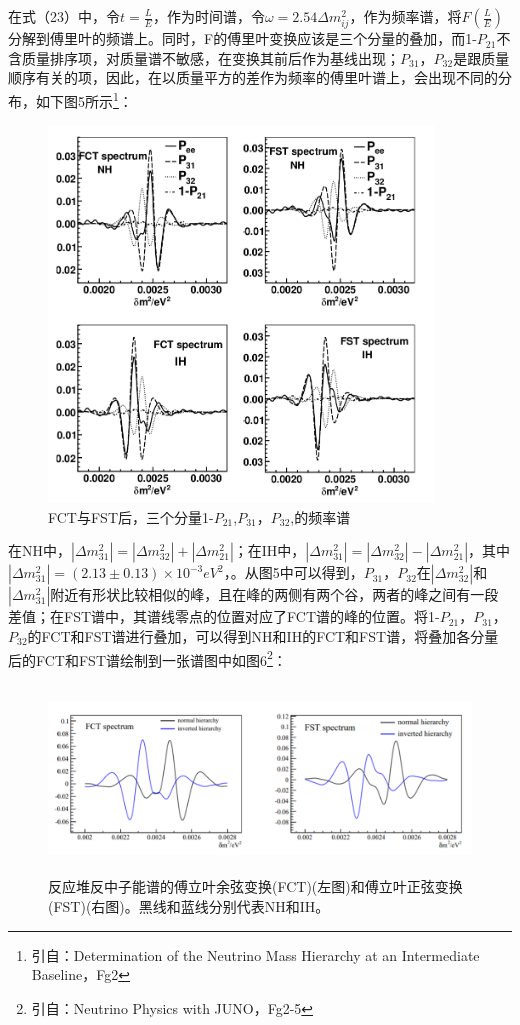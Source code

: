 \documentclass[10pt,a4paper]{article}
\begin{document}
在式（23）中，令$t=\frac{L}{E}$，作为时间谱，令$\omega=2.54\Delta m_{ij}^2$，作为频率谱，将$F(\frac{L}{E})$分解到傅里叶的频谱上。同时，F的傅里叶变换应该是三个分量的叠加，而1-$P_{21}$不含质量排序项，对质量谱不敏感，在变换其前后作为基线出现；$P_{31}$，$P_{32}$是跟质量顺序有关的项，因此，在以质量平方的差作为频率的傅里叶谱上，会出现不同的分布，如下图5所示\footnote{引自：Determination of the Neutrino Mass Hierarchy at an Intermediate Baseline，Fg2}：
\begin{figure}[ht]
 \centering
 \includegraphics[height=10cm]{images/diff-P31-P32.png}
 \caption{FCT与FST后，三个分量1-$P_{21}$,$P_{31}$，$P_{32}$,的频率谱}
 \label{fig:singleblock}
\end{figure}


在NH中，$|\Delta m_{31}^2|=|\Delta m_{32}^2|+|\Delta m_{21}^2|$；在IH中，$|\Delta m_{31}^2|=|\Delta m_{32}^2|-|\Delta m_{21}^2|$，其中$|\Delta m_{31}^2|=(2.13 \pm 0.13) \times 10^{-3}{eV}^2 $，。从图5中可以得到，$P_{31}$，$P_{32}$在$|\Delta m_{32}^2|$和$|\Delta m_{31}^2|$附近有形状比较相似的峰，且在峰的两侧有两个谷，两者的峰之间有一段差值；在FST谱中，其谱线零点的位置对应了FCT谱的峰的位置。将1-$P_{21}$，$P_{31}$，$P_{32}$的FCT和FST谱进行叠加，可以得到NH和IH的FCT和FST谱，将叠加各分量后的FCT和FST谱绘制到一张谱图中如图6\footnote{引自：Neutrino Physics with JUNO，Fg2-5}：
\begin{figure}[ht]
 \centering
 \includegraphics[height=5cm]{images/傅里叶图谱.png}
 \caption{反应堆反中子能谱的傅立叶余弦变换(FCT)(左图)和傅立叶正弦变换(FST)(右图)。黑线和蓝线分别代表NH和IH。}
 \label{fig:singleblock}
\end{figure}
\end{document}
